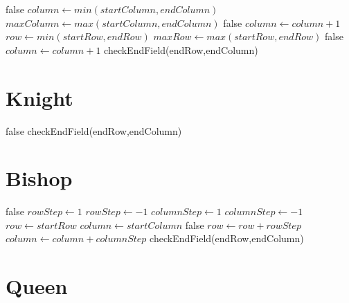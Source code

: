 \begin{algorithmic}
    \State \Return false
\EndIf
{}
    \State $column\gets min(startColumn,endColumn)$
    \State $maxColumn\gets max(startColumn,endColumn)$
   		 \State \Return false
   	 \EndIf
   	 \State $column\gets column + 1$
    \EndWhile
\Else
	\State $row\gets min(startRow,endRow)$
    \State $maxRow\gets max(startRow,endRow)$
   		 \State \Return false
   	 \EndIf
   	 \State $column\gets column + 1$
    \EndWhile
\EndIf
\State \Return checkEndField(endRow,endColumn)
\end{algorithmic}


\section{Knight}

\begin{algorithmic}
    \State \Return false
\EndIf
\State \Return checkEndField(endRow,endColumn)
\end{algorithmic}

\section{Bishop}

\begin{algorithmic}
    \State \Return false
\EndIf
{}
    \State $rowStep\gets 1$
\Else
	\State $rowStep\gets -1$
\EndIf
{}
    \State $columnStep\gets 1$
\Else
	\State $columnStep\gets -1$
\EndIf
\State $row\gets startRow$
\State $column\gets startColumn$
   		 \State \Return false
   	 \EndIf
   	 \State $row\gets row +rowStep$
   	 \State $column\gets column + columnStep$
    \EndWhile
 \State \Return checkEndField(endRow,endColumn)
\end{algorithmic}

\section{Queen}

